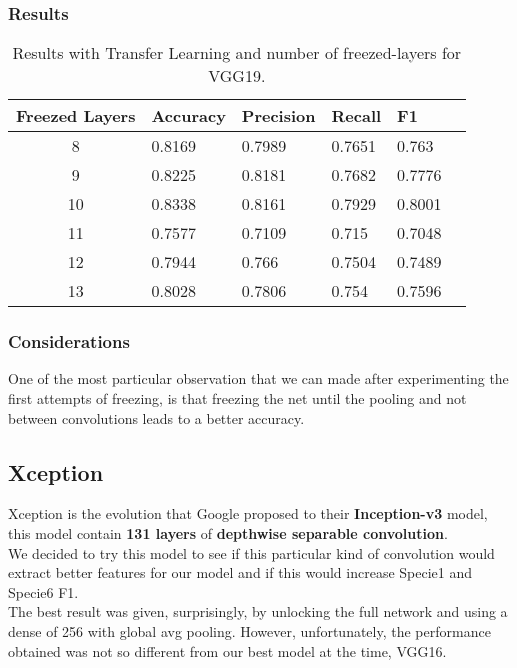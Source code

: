 \documentclass[11pt]{article}
\begin{document}
\subsubsection{Results}
\begin{table}[ht]
\centering
\begin{adjustbox}{width=200}
\small
\begin{tabular}{|c|l|l|l|l|l}

\hline \bf Freezed Layers & \bf Accuracy & \bf Precision & \bf Recall & \bf F1 \\ \hline
8 & 0.8169 & 0.7989 & 0.7651 & 0.763\\
9 & 0.8225 & 0.8181 & 0.7682 & 0.7776\\
10 & 0.8338 & 0.8161 & 0.7929 & 0.8001\\
11 & 0.7577 & 0.7109 & 0.715 & 0.7048\\
12 & 0.7944 & 0.766 & 0.7504 & 0.7489\\
13 & 0.8028 & 0.7806 & 0.754 & 0.7596\\
\hline
\end{tabular}
\end{adjustbox}
\caption{Results with Transfer Learning and number of freezed-layers for VGG19.}
\label{vgg19_results}
\end{table}

\subsubsection{Considerations}
One of the most particular observation that we can made after experimenting the first attempts of freezing, is that freezing the net
until the pooling and not between convolutions leads to a better accuracy.

\subsection{Xception}
Xception is the evolution that Google proposed to their \textbf{Inception-v3} model, this model contain \textbf{131 layers} of \textbf{depthwise separable convolution}.\\
We decided to try this model to see if this particular kind of convolution would extract better features for our model and if this would increase Specie1 and Specie6 F1.\\
The best result was given, surprisingly, by unlocking the full network and using a dense of 256 with global avg pooling.
However, unfortunately, the performance obtained was not so different from our best model at the time, VGG16.
\end{document}
